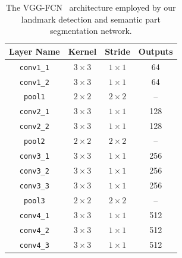 \begin{table}
  \caption{The
    VGG-FCN~\cite{simonyan2014vgg,long2015fully}
    architecture employed by our landmark detection and semantic
    part segmentation network.}
\label{tab:archlist}
\centering
\begin{tabular}{|c|c|c|c|}
\hline
Layer Name           & Kernel       & Stride       &  Outputs  \\
\hline\hline
\texttt{conv1\_1}    & $3 \times 3$ & $1 \times 1$ &  64  \\
\texttt{conv1\_2}    & $3 \times 3$ & $1 \times 1$ &  64  \\
\texttt{pool1}       & $2 \times 2$ & $2 \times 2$ &  --  \\
\texttt{conv2\_1}    & $3 \times 3$ & $1 \times 1$ &  128 \\
\texttt{conv2\_2}    & $3 \times 3$ & $1 \times 1$ &  128 \\
\texttt{pool2}       & $2 \times 2$ & $2 \times 2$ &  --  \\
\texttt{conv3\_1}    & $3 \times 3$ & $1 \times 1$ &  256 \\
\texttt{conv3\_2}    & $3 \times 3$ & $1 \times 1$ &  256 \\
\texttt{conv3\_3}    & $3 \times 3$ & $1 \times 1$ &  256 \\
\texttt{pool3}       & $2 \times 2$ & $2 \times 2$ &  --  \\
\texttt{conv4\_1}    & $3 \times 3$ & $1 \times 1$ & 512  \\
\texttt{conv4\_2}    & $3 \times 3$ & $1 \times 1$ & 512  \\
\texttt{conv4\_3}    & $3 \times 3$ & $1 \times 1$ & 512  \\


\end{tabular}
\end{table}
